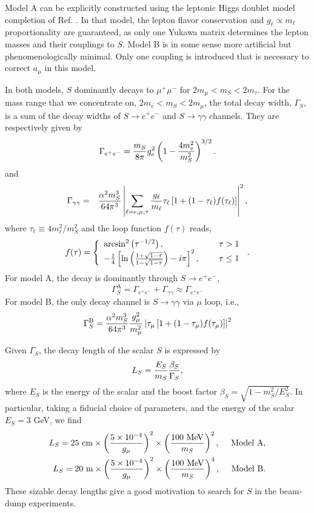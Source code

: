 \documentclass[prd,onecolumn,notitlepage,
nofootinbib,aps,tightenlines,
preprintnumbers,amsmath,amssymb,amsfonts,showpacs,superscriptaddress]{revtex4-1}
\newcommand{\beq}{\begin{equation}}
\newcommand{\eeq}{\end{equation}}
\newcommand{\be}{\begin{eqnarray}}
\newcommand{\ee}{\end{eqnarray}}
\begin{document}
Model A can be explicitly constructed using the leptonic Higgs doublet model completion of Ref. \cite{Batell:2016ove}. 
In that model, the lepton flavor conservation and $g_\ell\propto m_\ell$ proportionality are guaranteed, as only one Yukawa matrix 
determines the lepton masses and their couplings to $S$. Model B is in some sense more artificial but phenomenologically minimal. Only one coupling 
is introduced that is necessary to correct $a_\mu$ in this model. 

In both models,  $S$ dominantly decays to $\mu^+\mu^-$ for $2m_\mu < m_S < 2m_\tau$. For the mass range that we concentrate on, $2m_e< m_S<2m_\mu$, the total decay width, $\Gamma_S$, is a sum of the decay widths of  $S\to e^+e^-$ and $S\to \gamma \gamma $ channels. They are respectively given by
\be
\Gamma_{e^+e^-}  = {m_S \over 8 \pi} g_e^2\left(1-{4 m_e^2 \over m_S^2}\right)^{3/2}.
\ee
and 
\be
\Gamma_{\gamma \gamma}&=& {\alpha^2 m_S^3 \over 64 \pi^3}\left|\sum_{\ell=e,\mu,\tau}{g_\ell \over m_\ell}\tau_\ell\left[1+(1-\tau_\ell) f(\tau_\ell)\right]\right|^2, 
\ee
where $\tau_\ell \equiv {4 m_\ell^2/m_S^2}$ and the loop function $f(\tau)$ reads,  
\be
 f(\tau) = \left\{ \begin{array}{ll}
{\rm arcsin}^2\left( {\tau^{-1/2}} \right), & \hspace{0.5cm} \tau > 1 \\
-\frac{1}{4} \left[ \ln\left( \frac{1+\sqrt{1-\tau}}{1-\sqrt{1-\tau}} \right) -i\pi \right]^2, & \hspace{0.5cm} \tau\leq 1
\end{array}\right.\,.
\ee
For model A, the decay is dominantly through $S\to e^+ e^-$,
\beq
\Gamma_S^\text{A} = \Gamma_{e^+ e^-}+\Gamma_{\gamma\gamma} \approx \Gamma_{e^+ e^-}
\eeq 
For model B, the only decay channel is $S\to \gamma \gamma$ via $\mu$ loop, i.e.,
\beq
\Gamma_S^\text{B}= {\alpha^2 m_S^3 \over 64 \pi^3}{g_\mu^2 \over m_\mu^2}\left|\tau_\mu\left[1+(1-\tau_\mu) f(\tau_\mu)\right]\right|^2
\eeq

Given $\Gamma_S$, the decay length of the scalar $S$ is expressed by
\be
\label{decaylength}
L_{S}={E_S \over m_S}   \frac{\beta_S}{\Gamma_{S}},
\ee
 where $E_S$ is the energy of the scalar and the boost factor $\beta_S=\sqrt{1-{m_S^2/ E_S^2}}$. In particular, taking a fiducial choice of parameters, and the energy of the scalar $ E_S= 3$ GeV, we find
\begin{eqnarray} 
L_S =25~ {\rm cm} \times \left( \frac{5\times 10^{-4}}{g_\mu}\right)^2\times \left( \frac{100~{\rm MeV}}{m_S}\right)^2,~~~~{\rm Model~A},\\
L_S =20~ {\rm m}\times \left( \frac{5\times 10^{-4}}{g_\mu}\right)^2\times \left( \frac{100~{\rm MeV}}{m_S}\right)^4,~~~~{\rm Model~B}.
\end{eqnarray} 
These sizable decay lengths give a good motivation to search for $S$ in the beam-dump experiments.
\end{document}
